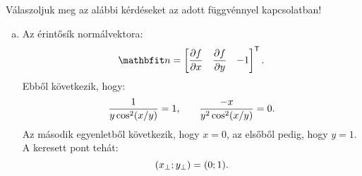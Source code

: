 \begin{exercise}{%
    Válaszoljuk meg az alábbi kérdéseket az adott függvénnyel kapcsolatban!
  }
{\begin{enumerate}[a)]
\[\begin{bmatrix}
            \end{bmatrix}^{\mathsf T}
            \begin{bmatrix}
              3/5 \\ -4/5
            \end{bmatrix}
            = \frac{3 + 4\pi}{5}
            \text.
          \]
          Az érintő egyenlete ezek alapján:
          \[
            \frac{x - \pi}{3/5} = \frac{y - 1}{-4/5} = \frac{z - 0}{(3 + 4\pi)/5}
            \text.
          \]
    \item Az érintősík normálvektora:
          \[
            \rvec n = \begin{bmatrix}
              \displaystyle\pdv{f}{x} & \displaystyle\pdv{f}{y} & -1
            \end{bmatrix}^{\mathsf T}
            \text.
          \]
          Ebből következik, hogy:
          \[
            \dfrac{1}{y \cos^2(x / y)} = 1
            \text,\qquad
            \dfrac{-x}{y^2 \cos^2(x / y)} = 0
            \text.
          \]
          Az második egyenletből következik, hogy $x = 0$, az elsőből pedig,
          hogy $y = 1$. A keresett pont tehát:
          \[
            (x_\perp; y_\perp) = (0; 1)
            \text.
          \]
  \end{enumerate}
  }
\end{exercise}

